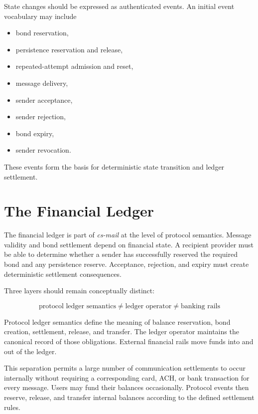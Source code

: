 \documentclass[11pt]{article}
\begin{document}
State changes should be expressed as authenticated events. An initial event vocabulary may include

\begin{itemize}[leftmargin=2em]
    \item bond reservation,
    \item persistence reservation and release,
    \item repeated-attempt admission and reset,
    \item message delivery,
    \item sender acceptance,
    \item sender rejection,
    \item bond expiry,
    \item sender revocation.
\end{itemize}

These events form the basis for deterministic state transition and ledger settlement.

\section{The Financial Ledger}

The financial ledger is part of \textit{cs-mail} at the level of protocol semantics. Message validity and bond settlement depend on financial state. A recipient provider must be able to determine whether a sender has successfully reserved the required bond and any persistence reserve. Acceptance, rejection, and expiry must create deterministic settlement consequences.

Three layers should remain conceptually distinct:

\begin{equation}
\boxed{
\text{protocol ledger semantics}
\neq
\text{ledger operator}
\neq
\text{banking rails}
}
\end{equation}

Protocol ledger semantics define the meaning of balance reservation, bond creation, settlement, release, and transfer. The ledger operator maintains the canonical record of those obligations. External financial rails move funds into and out of the ledger.

This separation permits a large number of communication settlements to occur internally without requiring a corresponding card, ACH, or bank transaction for every message. Users may fund their balances occasionally. Protocol events then reserve, release, and transfer internal balances according to the defined settlement rules.
\end{document}
